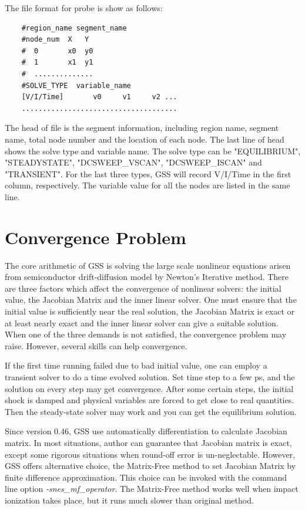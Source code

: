 \documentclass[11pt,pdftex]{article}
\begin{document}
The file format for probe is show as follows:
\begin{verbatim}
    #region_name segment_name
    #node_num  X   Y
    #  0       x0  y0
    #  1       x1  y1
    #  ..............
    #SOLVE_TYPE  variable_name
    [V/I/Time]       v0     v1     v2 ...
    .....................................
\end{verbatim}
The head of file is the segment information, including region name,
segment name, total node number and the location of each node. The
last line of head shows the solve type and variable name. The solve
type can be "EQUILIBRIUM", "STEADYSTATE", "DCSWEEP\_VSCAN",
"DCSWEEP\_ISCAN" and "TRANSIENT". For the last three types, GSS will
record V/I/Time in the first column, respectively. The variable
value for all the nodes are listed in the same line.



\newpage
\section{Convergence Problem}
The core arithmetic of GSS is solving the large scale nonlinear
equations arisen from semiconductor drift-diffusion model by
Newton's Iterative method. There are three factors which affect the
convergence of nonlinear solvers: the initial value, the Jacobian
Matrix and the inner linear solver. One must ensure that the initial
value is sufficiently near the real solution, the Jacobian Matrix is
exact or at least nearly exact and the inner linear solver can give
a suitable solution. When one of the three demands is not satisfied,
the convergence problem may raise. However, several skills can help
convergence.

If the first time running failed due to bad initial value, one can
employ a transient solver to do a time evolved solution. Set time
step to a few ps, and the solution on every step may get
convergence. After some certain steps, the initial shock is damped
and physical variables are forced to get close to real quantities.
Then the steady-state solver may work and you can get the
equilibrium solution.

Since version 0.46, GSS use automatically differentiation to
calculate Jacobian matrix. In most situations, author can guarantee
that Jacobian matrix is exact, except some rigorous situations when
round-off error is un-neglectable. However, GSS offers alternative
choice, the Matrix-Free method to set Jacobian Matrix by finite
difference approximation. This choice can be invoked with the
command line option \textit{-snes\_mf\_operator}. The Matrix-Free
method works well when impact ionization takes place, but it runs
much slower than original method.
\end{document}
